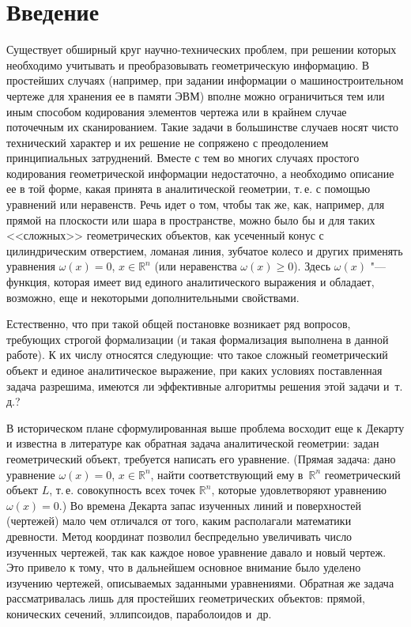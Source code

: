 \chapter*{Введение}

Существует обширный круг научно-технических проблем, при решении которых
необходимо учитывать и преобразовывать геометрическую информацию.
В простейших случаях (например, при задании информации о машиностроительном
чертеже для хранения ее в памяти ЭВМ) вполне можно ограничиться тем или иным
способом кодирования элементов чертежа или в крайнем случае поточечным их
сканированием. Такие задачи в большинстве случаев носят чисто технический
характер и их решение не сопряжено с преодолением принципиальных затруднений.
Вместе с тем во многих случаях простого кодирования геометрической
информации недостаточно, а необходимо описание ее в той форме, какая принята
в аналитической геометрии, т.\,е. с помощью уравнений или неравенств. Речь
идет о том, чтобы так же, как, например, для прямой на плоскости или шара
в пространстве, можно было бы и для таких <<сложных>> геометрических
объектов, как усеченный конус с цилиндрическим отверстием, ломаная линия,
зубчатое колесо и других применять уравнения $\omega(x)=0$, $x\in\mathbb R^n$
(или неравенства $\omega(x)\ge0$). Здесь $\omega(x)$ "--- функция, которая
имеет вид единого аналитического выражения и обладает, возможно, еще
и некоторыми дополнительными свойствами.

Естественно, что при такой общей постановке возникает ряд вопросов,
требующих строгой формализации (и такая формализация выполнена в данной
работе). К их числу относятся следующие: что такое сложный геометрический
объект и единое аналитическое выражение, при каких условиях поставленная
задача разрешима, имеются ли эффективные алгоритмы решения этой задачи
и~т.\,д.?

В историческом плане сформулированная выше проблема восходит еще к Декарту
и известна в литературе как обратная задача аналитической геометрии: задан
геометрический объект, требуется написать его уравнение. (Прямая задача:
дано уравнение $\omega(x)=0$, $x\in\mathbb R^n$, найти соответствующий ему
в~$\mathbb R^n$ геометрический объект $L$, т.\,е. совокупность всех точек
$\mathbb R^n$, которые удовлетворяют уравнению $\omega(x)=0$.) Во времена
Декарта запас изученных линий и поверхностей (чертежей) мало чем отличался от
того, каким располагали математики древности. Метод координат
%
позволил беспредельно увеличивать число изученных чертежей, так как каждое
новое уравнение давало и новый чертеж. Это привело к тому, что в дальнейшем
основное внимание было уделено изучению чертежей, описываемых заданными
уравнениями. Обратная же задача рассматривалась лишь для простейших
геометрических объектов: прямой, конических сечений, эллипсоидов,
параболоидов и~др.

